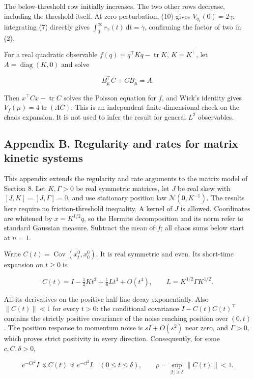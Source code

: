 \documentclass[
  british,
  11pt,
  a4paper,
]{article}
\begin{document}
The below-threshold row initially increases. The two other rows
decrease, including the threshold itself. At zero perturbation, (10)
gives \(V_{q_1}(0)=2\gamma\); integrating (7) directly gives
\(\int_0^\infty r_\gamma(t)\,\mathrm dt=\gamma\), confirming the factor
of two in (2).

For a real quadratic observable \(f(q)=q^\top Kq-\operatorname{tr}K\),
\(K=K^\top\), let \(A=\mathop{\mathrm{diag}}(K,0)\) and solve

\[
B_\mu^\top C+CB_\mu=A.
\]

Then \(x^\top Cx-\operatorname{tr}C\) solves the Poisson equation for
\(f\), and Wick's identity gives \(V_f(\mu)=4\operatorname{tr}(AC)\).
This is an independent finite-dimensional check on the chaos expansion.
It is not used to infer the result for general \(L^2\) observables.

\newpage

\subsection{Appendix B. Regularity and rates for matrix kinetic
systems}\label{appendix-b.-regularity-and-rates-for-matrix-kinetic-systems}

This appendix extends the regularity and rate arguments to the matrix
model of Section 8. Let \(K,\Gamma>0\) be real symmetric matrices, let
\(J\) be real skew with \([J,K]=[J,\Gamma]=0\), and use stationary
position law \(\mathcal N(0,K^{-1})\). The results here require no
friction-threshold inequality. A kernel of \(J\) is allowed. Coordinates
are whitened by \(x=K^{1/2}q\), so the Hermite decomposition and its
norm refer to standard Gaussian measure. Subtract the mean of \(f\); all
chaos sums below start at \(n=1\).

Write \(C(t)=\mathop{\mathrm{Cov}}(x_t^0,x_0^0)\). It is real symmetric
and even. Its short-time expansion on \(t\ge0\) is

\[
C(t)=I-\tfrac12Kt^2+\tfrac16Lt^3+O(t^4),
\qquad L=K^{1/2}\Gamma K^{1/2}. \tag{B1}
\]

All its derivatives on the positive half-line decay exponentially. Also
\(\|C(t)\|<1\) for every \(t>0\): the conditional covariance
\(I-C(t)C(t)^\top\) contains the strictly positive covariance of the
noise reaching position over \((0,t)\). The position response to
momentum noise is \(sI+O(s^2)\) near zero, and \(\Gamma>0\), which
proves strict positivity in every direction. Consequently, for some
\(c,C,\delta>0\),

\[
e^{-Ct^2}I\preceq C(t)\preceq e^{-ct^2}I
\quad(0\le t\le\delta),\qquad
\rho=\sup_{|t|\ge\delta}\|C(t)\|<1. \tag{B2}
\]
\end{document}
